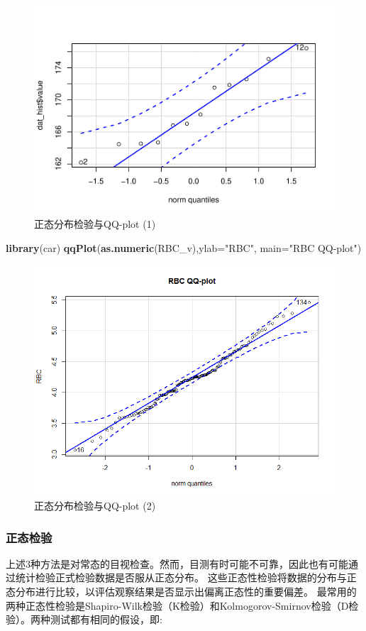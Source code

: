\documentclass[
]{article}
\newenvironment{Shaded}{\begin{snugshade}}{\end{snugshade}}
\newcommand{\DataTypeTok}[1]{\textcolor[rgb]{0.13,0.29,0.53}{#1}}
\newcommand{\KeywordTok}[1]{\textcolor[rgb]{0.13,0.29,0.53}{\textbf{#1}}}
\newcommand{\NormalTok}[1]{#1}
\newcommand{\StringTok}[1]{\textcolor[rgb]{0.31,0.60,0.02}{#1}}
\begin{document}
\begin{figure}

{\centering \includegraphics[width=0.49\linewidth,height=0.49\textheight]{figs/qqplot} 

}

\caption{正态分布检验与QQ-plot (1)}\label{fig:qqplot}
\end{figure}

\begin{Shaded}
\begin{Highlighting}[]
\KeywordTok{library}\NormalTok{(car)}
\KeywordTok{qqPlot}\NormalTok{(}\KeywordTok{as.numeric}\NormalTok{(RBC_v),}\DataTypeTok{ylab=}\StringTok{"RBC"}\NormalTok{, }\DataTypeTok{main=}\StringTok{"RBC QQ-plot"}\NormalTok{)}
\end{Highlighting}
\end{Shaded}

\begin{figure}

{\centering \includegraphics[width=0.49\linewidth,height=0.49\textheight]{image/qqPlot} 

}

\caption{正态分布检验与QQ-plot (2)}\label{fig:qqplot1}
\end{figure}

\hypertarget{ux6b63ux6001ux68c0ux9a8c}{%
\subsubsection{正态检验}\label{ux6b63ux6001ux68c0ux9a8c}}

上述3种方法是对常态的目视检查。然而，目测有时可能不可靠，因此也有可能通过统计检验正式检验数据是否服从正态分布。
这些正态性检验将数据的分布与正态分布进行比较，以评估观察结果是否显示出偏离正态性的重要偏差。
最常用的两种正态性检验是Shapiro-Wilk检验（K检验）和Kolmogorov-Smirnov检验（D检验）。两种测试都有相同的假设，即:
\end{document}
